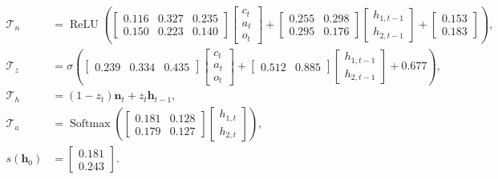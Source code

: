 \begingroup\small\setlength{\arraycolsep}{3pt}
\begin{align*}
\mathcal T_n &= \operatorname{ReLU}\!\left(\begin{bmatrix}0.116 & 0.327 & 0.235 \\ 0.150 & 0.223 & 0.140\end{bmatrix}\begin{bmatrix}c_t \\ a_t \\ o_t\end{bmatrix} + \begin{bmatrix}0.255 & 0.298 \\ 0.295 & 0.176\end{bmatrix}\begin{bmatrix}h_{1,t-1} \\ h_{2,t-1}\end{bmatrix} + \begin{bmatrix}0.153 \\ 0.183\end{bmatrix}\right), \\[1em]
\mathcal T_z &= \sigma\!\left(\begin{bmatrix}0.239 & 0.334 & 0.435\end{bmatrix}\begin{bmatrix}c_t \\ a_t \\ o_t\end{bmatrix} + \begin{bmatrix}0.512 & 0.885\end{bmatrix}\begin{bmatrix}h_{1,t-1} \\ h_{2,t-1}\end{bmatrix} + 0.677\right), \\[1em]
\mathcal T_h &= (1-z_t)\mathbf n_t + z_t\mathbf h_{t-1}, \\[1em]
\mathcal T_a &= \operatorname{Softmax}\!\left(\begin{bmatrix}0.181 & 0.128 \\ 0.179 & 0.127\end{bmatrix}\begin{bmatrix}h_{1,t} \\ h_{2,t}\end{bmatrix}\right), \\[1em]
s(\mathbf h_0) &= \begin{bmatrix}0.181 \\ 0.243\end{bmatrix}.
\end{align*}\endgroup
